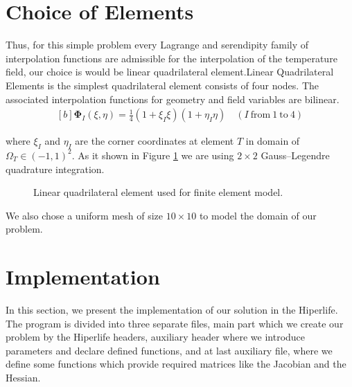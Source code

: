 \documentclass[]{article}
\begin{document}
\section{Choice of Elements} \label{sec: coe}
Thus, for this simple problem every Lagrange and serendipity family of interpolation functions are admissible for the interpolation of the temperature field, our choice is would be linear quadrilateral element.Linear  Quadrilateral Elements is the simplest quadrilateral element consists of four nodes. The associated interpolation functions for geometry and ﬁeld variables are bilinear.
\begin{equation}\label{eq18}
	\begin{aligned}[b]
		\boldsymbol{\Phi}_{I}(\xi, \eta) = \frac{1}{4}(1+\xi_I\xi)(1+\eta_I\eta) \quad (I \ \text{from} \ 1 \ \text{to} \ 4)
	\end{aligned}
\end{equation}

where $\xi_{I}$ and $\eta_{I}$ are the corner coordinates at element $T$ in domain of $\Omega_{T} \in (-1,1)^2$. As it shown in Figure \ref{fig_el} we are using $2 \times 2$ Gauss–Legendre quadrature integration.
\begin{figure}[htbp]
	\centering
	
	\caption{Linear quadrilateral element used for finite element model.}
	\label{fig_el}
\end{figure}
We also chose a uniform mesh of size $10 \times 10$ to model the domain of our problem.
\section{Implementation} \label{sec: imp}
In this section, we present the implementation of our solution in the Hiperlife. The program is divided into three separate files, main part which we create our problem by the Hiperlife headers, auxiliary header where we introduce parameters and declare defined functions, and at last auxiliary file, where we define some functions which provide required matrices like the Jacobian and the Hessian.
\end{document}
